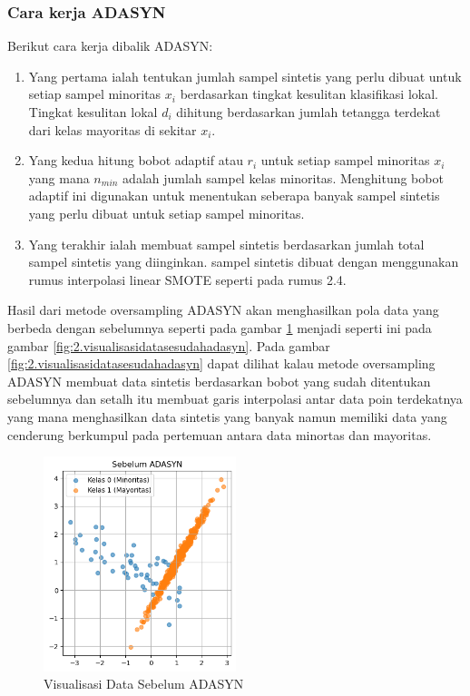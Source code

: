 \subsubsection{Cara kerja ADASYN}
Berikut cara kerja dibalik ADASYN:
\begin{enumerate}[noitemsep]
    \item Yang pertama ialah tentukan jumlah sampel sintetis yang perlu dibuat untuk setiap sampel minoritas $x_i$ berdasarkan tingkat kesulitan klasifikasi lokal. Tingkat kesulitan lokal $d_i$ dihitung berdasarkan jumlah tetangga terdekat dari kelas mayoritas di sekitar $x_i$.
    \item Yang kedua hitung bobot adaptif atau $r_i$ untuk setiap sampel minoritas $x_i$\\
    yang mana $n_{min}$ adalah jumlah sampel kelas minoritas. Menghitung bobot adaptif ini digunakan untuk menentukan seberapa banyak sampel sintetis yang perlu dibuat untuk setiap sampel minoritas.
    \item Yang terakhir ialah membuat sampel sintetis berdasarkan jumlah total sampel sintetis yang diinginkan. sampel sintetis dibuat dengan menggunakan rumus interpolasi linear SMOTE seperti pada rumus 2.4.\\
\end{enumerate}
Hasil dari metode oversampling ADASYN akan menghasilkan pola data yang berbeda dengan sebelumnya seperti pada gambar \ref{fig:2.visualisasidatasebelumadasyn} menjadi seperti ini pada gambar \ref{fig:2.visualisasidatasesudahadasyn}. Pada gambar \ref{fig:2.visualisasidatasesudahadasyn} dapat dilihat kalau metode oversampling ADASYN membuat data sintetis berdasarkan bobot yang sudah ditentukan sebelumnya dan setalh itu membuat garis interpolasi antar data poin terdekatnya yang mana menghasilkan data sintetis yang banyak namun memiliki data yang cenderung berkumpul pada pertemuan antara data minortas dan mayoritas.

\begin{figure}[H]
	\centering
	\includegraphics[width=0.5\textwidth]{figure/visualisasi_data_sebelum_adasyn.png}
	\caption{Visualisasi Data Sebelum ADASYN}
	\label{fig:2.visualisasidatasebelumadasyn}
\end{figure}

